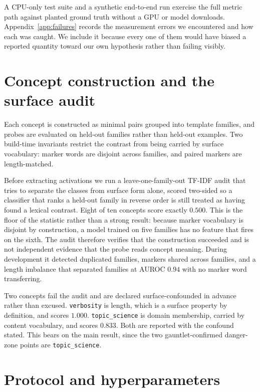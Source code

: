 \documentclass{article}
\begin{document}
A CPU-only test suite and a synthetic end-to-end run exercise the full metric
path against planted ground truth without a GPU or model downloads.
Appendix~\ref{app:failures} records the measurement errors we encountered and
how each was caught. We include it because every one of them would have biased
a reported quantity toward our own hypothesis rather than failing visibly.




\appendix

\section{Concept construction and the surface audit}
\label{app:concepts}

Each concept is constructed as minimal pairs grouped into template families, and
probes are evaluated on held-out families rather than held-out examples. Two
build-time invariants restrict the contrast from being carried by surface
vocabulary: marker words are disjoint across families, and paired markers are
length-matched.

Before extracting activations we run a leave-one-family-out TF-IDF audit that
tries to separate the classes from surface form alone, scored two-sided so a
classifier that ranks a held-out family in reverse order is still treated as
having found a lexical contrast. Eight of ten concepts score exactly $0.500$.
This is the floor of the statistic rather than a strong result: because marker
vocabulary is disjoint by construction, a model trained on five families has no
feature that fires on the sixth. The audit therefore verifies that the
construction succeeded and is not independent evidence that the probe reads
concept meaning. During development it detected duplicated families, markers
shared across families, and a length imbalance that separated families at AUROC
$0.94$ with no marker word transferring.

Two concepts fail the audit and are declared surface-confounded in advance
rather than excused. \texttt{verbosity} is length, which is a surface property by
definition, and scores $1.000$. \texttt{topic\_science} is domain membership,
carried by content vocabulary, and scores $0.833$. Both are reported with the
confound stated. This bears on the main result, since the two gauntlet-confirmed
danger-zone points are \texttt{topic\_science}.

\section{Protocol and hyperparameters}
\label{app:hyper}
\end{document}
